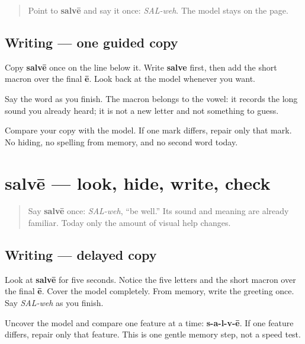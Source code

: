 \begin{quote}
Point to \textbf{salvē} and say it once: \emph{SAL-weh}. The model stays on the page.
\end{quote}

\subsection*{Writing — one guided copy}
Copy \textbf{salvē} once on the line below it. Write \textbf{salve} first, then add the short macron over the final \textbf{ē}. Look back at the model whenever you want.

Say the word as you finish. The macron belongs to the vowel: it records the long sound you already heard; it is not a new letter and not something to guess.

\begin{tcolorbox}[breakable,colback=teal!4,colframe=teal!35!black,title={Before you move on}]
Compare your copy with the model. If one mark differs, repair only that mark. No hiding, no spelling from memory, and no second word today.
\end{tcolorbox}
\section[salvē]{salvē — look, hide, write, check}

\label{lesson:LA-W01-salve-delayed-copy}



\begin{quote}
Say \textbf{salvē} once: \emph{SAL-weh}, “be well.” Its sound and meaning are already familiar. Today only the amount of visual help changes.
\end{quote}

\subsection*{Writing — delayed copy}

Look at \textbf{salvē} for five seconds. Notice the five letters and the short macron over the final \textbf{ē}. Cover the model completely. From memory, write the greeting once. Say \emph{SAL-weh} as you finish.

Uncover the model and compare one feature at a time: \textbf{s-a-l-v-ē}. If one feature differs, repair only that feature. This is one gentle memory step, not a speed test.

